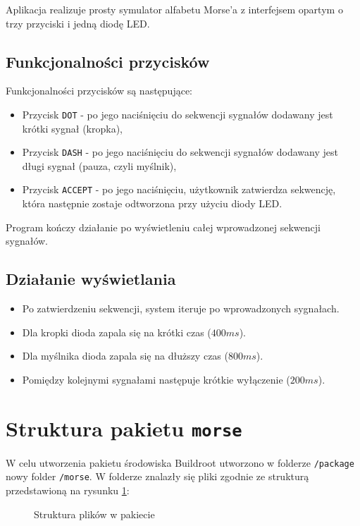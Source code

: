 \documentclass{article}
\begin{document}
Aplikacja realizuje prosty symulator alfabetu Morse'a z interfejsem opartym o trzy przyciski i jedną diodę LED.

\subsection{Funkcjonalności przycisków}

Funkcjonalności przycisków są następujące:

\begin{itemize}
    \item Przycisk \texttt{DOT} - po jego naciśnięciu do sekwencji sygnałów dodawany jest krótki sygnał (kropka),
    \item Przycisk \texttt{DASH} - po jego naciśnięciu do sekwencji sygnałów dodawany jest długi sygnał (pauza, czyli myślnik),
    \item Przycisk \texttt{ACCEPT} - po jego naciśnięciu, użytkownik zatwierdza sekwencję, która następnie zostaje odtworzona przy użyciu diody LED.
\end{itemize}

Program kończy działanie po wyświetleniu całej wprowadzonej sekwencji sygnałów.

\subsection{Działanie wyświetlania}

\begin{itemize}
    \item Po zatwierdzeniu sekwencji, system iteruje po wprowadzonych sygnałach.
    \item Dla kropki dioda zapala się na krótki czas ($400ms$).
    \item Dla myślnika dioda zapala się na dłuższy czas ($800ms$).
    \item Pomiędzy kolejnymi sygnałami następuje krótkie wyłączenie ($200ms$).
\end{itemize}

\section{Struktura pakietu \texttt{morse}}

W celu utworzenia pakietu środowiska Buildroot utworzono w folderze \texttt{/package} nowy folder \texttt{/morse}. W folderze znalazły się pliki zgodnie ze strukturą przedstawioną na rysunku \ref{fig:tree}:

\begin{figure}[H]
    \caption{Struktura plików w pakiecie}
    \label{fig:tree}
\end{figure}
\end{document}
